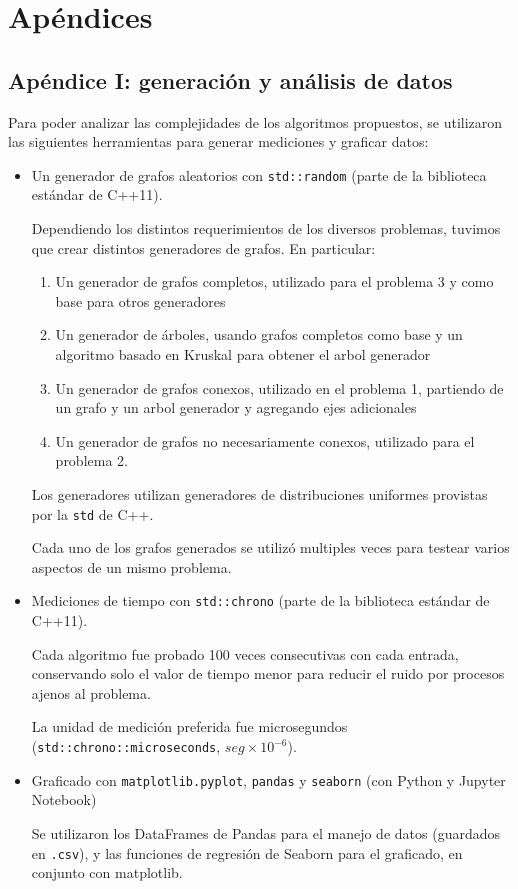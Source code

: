 \section{Apéndices}
	\subsection{Apéndice I: generación y análisis de datos}
	Para poder analizar las complejidades de los algoritmos propuestos, se utilizaron las siguientes herramientas para generar mediciones y graficar datos:

	\begin{itemize}
		\item Un generador de grafos aleatorios con \texttt{std::random} (parte de la biblioteca estándar de C++11).

		Dependiendo los distintos requerimientos de los diversos problemas, tuvimos que crear distintos generadores de grafos. En particular:

		\begin{enumerate}
			\item Un generador de grafos completos, utilizado para el problema 3 y como base para otros generadores
			\item Un generador de árboles, usando grafos completos como base y un algoritmo basado en Kruskal para obtener el arbol generador
			\item Un generador de grafos conexos, utilizado en el problema 1, partiendo de un grafo y un arbol generador y agregando ejes adicionales
			\item Un generador de grafos no necesariamente conexos, utilizado para el problema 2.
		\end{enumerate}

		Los generadores utilizan generadores de distribuciones uniformes provistas por la \texttt{std} de C++.

		Cada uno de los grafos generados se utilizó multiples veces para testear varios aspectos de un mismo problema.

		\item Mediciones de tiempo con \texttt{std::chrono} (parte de la biblioteca estándar de C++11).

		Cada algoritmo fue probado 100 veces consecutivas con cada entrada, conservando solo el valor de tiempo menor para reducir el ruido por procesos ajenos al problema.

		La unidad de medición preferida fue microsegundos (\texttt{std::chrono::microseconds}, $seg \times 10^{-6}$).

		\item Graficado con \texttt{matplotlib.pyplot}, \texttt{pandas} y \texttt{seaborn} (con Python y Jupyter Notebook)

		Se utilizaron los DataFrames de Pandas para el manejo de datos (guardados en \texttt{.csv}), y las funciones de regresión de Seaborn para el graficado, en conjunto con matplotlib.

	\end{itemize}

